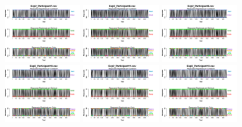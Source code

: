 \begin{figure}[th]
\includegraphics[width=0.30\textwidth]{Figures/BiasResp_Exp2_P7} \includegraphics[width=0.30\textwidth]{Figures/BiasResp_Exp2_P8} \includegraphics[width=0.30\textwidth]{Figures/BiasResp_Exp2_P9}
\includegraphics[width=0.30\textwidth]{Figures/BiasResp_Exp2_P10} \includegraphics[width=0.30\textwidth]{Figures/BiasResp_Exp2_P11} \includegraphics[width=0.30\textwidth]{Figures/BiasResp_Exp2_P12}

\end{figure}
